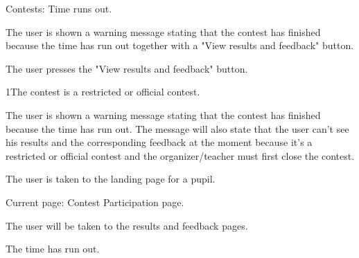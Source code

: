 \begin{uc}{Contests: Time runs out.}

    \begin{uc-mss}
        \item The user is shown a warning message stating that the contest has finished because the time has run out together with a "View results and feedback" button.
    \item The user presses the "View results and feedback" button.
    \end{uc-mss}

    \begin{uc-ext}

        \begin{uc-fail}{1}{The contest is a restricted or official contest.}
            \item The user is shown a warning message stating that the contest has finished because the time has run out. The message will also state that the user can't see his results and the corresponding feedback at the moment because it's a restricted or official contest and the organizer/teacher must first close the contest.
            \item The user is taken to the landing page for a pupil.
        \end{uc-fail}

    \end{uc-ext}

    \begin{uc-pre}
    \item Current page: Contest Participation page.
    \end{uc-pre}

    \begin{uc-post}
    \item The user will be taken to the results and feedback pages.
    \end{uc-post}

    \begin{uc-trig}
    The time has run out.
    \end{uc-trig}

\end{uc}
